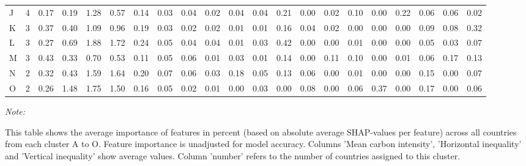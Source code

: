 \begin{table}[H]
{\begin{threeparttable}
\begin{tabular}[t]{lrrrrrrrrrrrrrrrrrrrr}
J & 4 & 0.17 & 0.19 & 1.28 & 0.57 & 0.14 & 0.03 & 0.04 & 0.02 & 0.04 & 0.04 & 0.21 & 0.00 & 0.02 & 0.10 & 0.00 & 0.22 & 0.06 & 0.06 & 0.02\\
K & 3 & 0.37 & 0.40 & 1.09 & 0.96 & 0.19 & 0.03 & 0.02 & 0.02 & 0.01 & 0.01 & 0.16 & 0.04 & 0.02 & 0.00 & 0.00 & 0.00 & 0.09 & 0.08 & 0.32\\
L & 3 & 0.27 & 0.69 & 1.88 & 1.72 & 0.24 & 0.05 & 0.04 & 0.04 & 0.01 & 0.03 & 0.42 & 0.00 & 0.00 & 0.01 & 0.00 & 0.00 & 0.05 & 0.03 & 0.07\\
M & 3 & 0.43 & 0.33 & 0.70 & 0.53 & 0.11 & 0.05 & 0.06 & 0.01 & 0.03 & 0.01 & 0.14 & 0.00 & 0.11 & 0.10 & 0.00 & 0.01 & 0.06 & 0.17 & 0.13\\
N & 2 & 0.32 & 0.43 & 1.59 & 1.64 & 0.20 & 0.07 & 0.06 & 0.03 & 0.18 & 0.05 & 0.13 & 0.06 & 0.00 & 0.01 & 0.00 & 0.00 & 0.15 & 0.00 & 0.07\\
O & 2 & 0.26 & 1.48 & 1.75 & 1.50 & 0.16 & 0.05 & 0.02 & 0.01 & 0.00 & 0.03 & 0.00 & 0.08 & 0.00 & 0.06 & 0.37 & 0.00 & 0.17 & 0.00 & 0.06\\
\bottomrule
\end{tabular}
\begin{tablenotes}
\item \textit{Note: } 
\item This table shows the average importance of features in percent (based on absolute average SHAP-values per feature) across all countries from each cluster A to O. Feature importance is unadjusted for model accuracy. Columns 'Mean carbon intensity', 'Horizontal inequality' and 'Vertical inequality' show average values. Column 'number' refers to the number of countries assigned to this cluster.
\end{tablenotes}
\end{threeparttable}}
\end{table}
